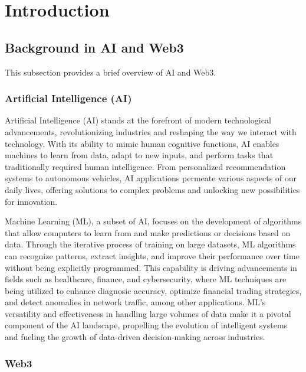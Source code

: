 \documentclass[conference]{IEEEtran}
\begin{document}


\section{Introduction}
\subsection{Background in AI and Web3}

This subsection provides a brief overview of AI and Web3.

\subsubsection{Artificial Intelligence (AI)} 


Artificial Intelligence (AI) stands at the forefront of modern technological advancements, revolutionizing industries and reshaping the way we interact with technology. With its ability to mimic human cognitive functions, AI enables machines to learn from data, adapt to new inputs, and perform tasks that traditionally required human intelligence. From personalized recommendation systems to autonomous vehicles, AI applications permeate various aspects of our daily lives, offering solutions to complex problems and unlocking new possibilities for innovation.


Machine Learning (ML), a subset of AI, focuses on the development of algorithms that allow computers to learn from and make predictions or decisions based on data. Through the iterative process of training on large datasets, ML algorithms can recognize patterns, extract insights, and improve their performance over time without being explicitly programmed. This capability is driving advancements in fields such as healthcare, finance, and cybersecurity, where ML techniques are being utilized to enhance diagnosic accuracy, optimize financial trading strategies, and detect anomalies in network traffic, among other applications. ML's versatility and effectiveness in handling large volumes of data make it a pivotal component of the AI landscape, propelling the evolution of intelligent systems and fueling the growth of data-driven decision-making across industries.

\subsubsection{Web3}
\end{document}
